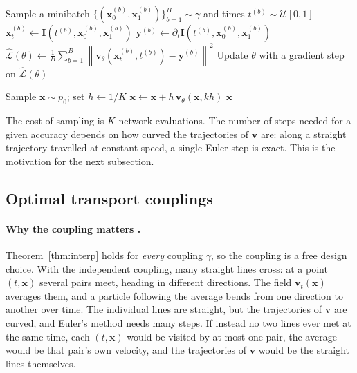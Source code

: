 \documentclass[11pt,a4paper]{article}
\numberwithin{equation}{section}     %
\theoremstyle{plain}        %
\theoremstyle{definition}   %
\theoremstyle{remark}       %
\begin{document}
\begin{algorithm}[htbp]
\caption{Flow matching: training}\label{alg:fmtrain}
\begin{algorithmic}[1]
\Repeat
\State Sample a minibatch $\{(\mathbf{x}_0^{(b)},\mathbf{x}_1^{(b)})\}_{b=1}^B\sim\gamma$ and times $t^{(b)}\sim\mathcal{U}[0,1]$
\State $\mathbf{x}_t^{(b)}\gets\mathbf{I}(t^{(b)},\mathbf{x}_0^{(b)},\mathbf{x}_1^{(b)})$ 
\State $\mathbf{y}^{(b)}\gets\partial_t\mathbf{I}(t^{(b)},\mathbf{x}_0^{(b)},\mathbf{x}_1^{(b)})$ 
\State $\hat{\mathcal{L}}(\theta)\gets\frac{1}{B}\sum_{b=1}^B\left\|\mathbf{v}_\theta(\mathbf{x}_t^{(b)},t^{(b)})-\mathbf{y}^{(b)}\right\|^2$
\State Update $\theta$ with a gradient step on $\hat{\mathcal{L}}(\theta)$
\end{algorithmic}
\end{algorithm}

\begin{algorithm}[htbp]
\caption{Flow matching: sampling with Euler's method}\label{alg:fmsample}
\begin{algorithmic}[1]
\State Sample $\mathbf{x}\sim p_0$; set $h\gets1/K$
\State $\mathbf{x}\gets\mathbf{x}+h\,\mathbf{v}_\theta(\mathbf{x},kh)$
\EndFor
\State \Return $\mathbf{x}$ 
\end{algorithmic}
\end{algorithm}

The cost of sampling is $K$ network evaluations. The number of steps needed for a given accuracy depends on how curved the trajectories of $\mathbf{v}$ are: along a straight trajectory travelled at constant speed, a single Euler step is exact. This is the motivation for the next subsection.

\subsection{Optimal transport couplings}

\paragraph{Why the coupling matters \citep{pooladian2023,tong2024}.} Theorem~\ref{thm:interp} holds for \emph{every} coupling $\gamma$, so the coupling is a free design choice. With the independent coupling, many straight lines cross: at a point $(t,\mathbf{x})$ several pairs meet, heading in different directions. The field $\mathbf{v}_t(\mathbf{x})$ averages them, and a particle following the average bends from one direction to another over time. The individual lines are straight, but the trajectories of $\mathbf{v}$ are curved, and Euler's method needs many steps. If instead no two lines ever met at the same time, each $(t,\mathbf{x})$ would be visited by at most one pair, the average would be that pair's own velocity, and the trajectories of $\mathbf{v}$ would be the straight lines themselves.
\end{document}
